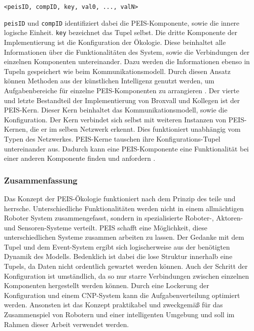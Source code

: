 {\tt <peisID, compID, key, val0, ..., valN>}

{\tt peisID} und {\tt compID} identifiziert dabei die PEIS-Komponente, sowie die innere logische Einheit. {\tt key} bezeichnet das Tupel selbst. Die dritte Komponente der Implementierung ist die Konfiguration der Ökologie. Diese beinhaltet alle Informationen über die Funktionalitäten des System, sowie die Verbindungen der einzelnen Komponenten untereinander. Dazu werden die Informationen ebenso in Tupeln gespeichert wie beim Kommunikationsmodell. Durch diesen Ansatz können Methoden aus der künstlichen Intelligenz genutzt werden, um Aufgabenbereiche für einzelne PEIS-Komponenten zu arrangieren \citep{lundh2005can}. Der vierte und letzte Bestandteil der Implementierung von Broxvall und Kollegen ist der PEIS-Kern. Dieser Kern beinhaltet das Kommunikationsmodell, sowie die Konfiguration. Der Kern verbindet sich selbst mit weiteren Instanzen von PEIS-Kernen, die er im selben Netzwerk erkennt. Dies funktioniert unabhängig vom Typen des Netzwerkes. PEIS-Kerne tauschen ihre Konfigurations-Tupel untereinander aus. Dadurch kann eine PEIS-Komponente eine Funktionalität bei einer anderen Komponente finden und anfordern \citep{Saffiotti:2005:PEA:1107548.1107615}.

\subsubsection{Zusammenfassung}
Das Konzept der PEIS-Ökologie funktioniert nach dem Prinzip des teile und herrsche. Unterschiedliche Funktionalitäten werden nicht in einem allmächtigen Roboter System zusammengefasst, sondern in spezialisierte Roboter-, Aktoren- und Sensoren-Systeme verteilt. PEIS schafft eine Möglichkeit, diese unterschiedlichen Systeme zusammen arbeiten zu lassen. Der Gedanke mit dem Tupel und dem Event-System ergibt sich logischerweise aus der benötigten Dynamik des Modells. Bedenklich ist dabei die lose Struktur innerhalb eine Tupels, da Daten nicht ordentlich gewartet werden können. Auch der Schritt der Konfiguration ist umständlich, da so nur starre Verbindungen zwischen einzelnen Komponenten hergestellt werden können. Durch eine Lockerung der Konfiguration und einem CNP-System kann die Aufgabenverteilung optimiert werden. Ansonsten ist das Konzept praktikabel und zweckgemäß für das Zusammenspiel von Robotern und einer intelligenten Umgebung und soll im Rahmen dieser Arbeit verwendet werden.

